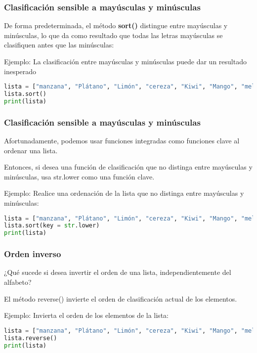 \begin{frame}[fragile]
  \frametitle{Clasificación sensible a mayúsculas y minúsculas}

  De forma predeterminada, el método \textbf{sort()} distingue entre
  mayúsculas y minúsculas, lo que da como resultado que todas las
  letras mayúsculas se clasifiquen antes que las minúsculas:

  \vspace{\baselineskip}
  Ejemplo: La clasificación entre mayúsculas y minúsculas puede dar
  un resultado inesperado
  \begin{lstlisting}[language=Python]
lista = ["manzana", "Plátano", "Limón", "cereza", "Kiwi", "Mango", "melón"]
lista.sort()
print(lista)
  \end{lstlisting}
\end{frame}

\begin{frame}[fragile]
  \frametitle{Clasificación sensible a mayúsculas y minúsculas}

  Afortunadamente, podemos usar funciones integradas como funciones
  clave al ordenar una lista.

  \vspace{\baselineskip}
  Entonces, si desea una función de clasificación que no distinga entre
  mayúsculas y minúsculas, usa str.lower como una función clave.

  \vspace{\baselineskip}
  Ejemplo: Realice una ordenación de la lista que no distinga entre
  mayúsculas y minúsculas:
  \begin{lstlisting}[language=Python]
lista = ["manzana", "Plátano", "Limón", "cereza", "Kiwi", "Mango", "melón"]
lista.sort(key = str.lower)
print(lista)
  \end{lstlisting}
\end{frame}

\begin{frame}[fragile]
  \frametitle{Orden inverso}

  ¿Qué sucede si desea invertir el orden de una lista,
  independientemente del alfabeto?

  El método reverse() invierte el orden de clasificación actual
  de los elementos.

  \vspace{\baselineskip}
  Ejemplo: Invierta el orden de los elementos de la lista:
  \begin{lstlisting}[language=Python]
lista = ["manzana", "Plátano", "Limón", "cereza", "Kiwi", "Mango", "melón"]
lista.reverse()
print(lista)
  \end{lstlisting}
\end{frame}



